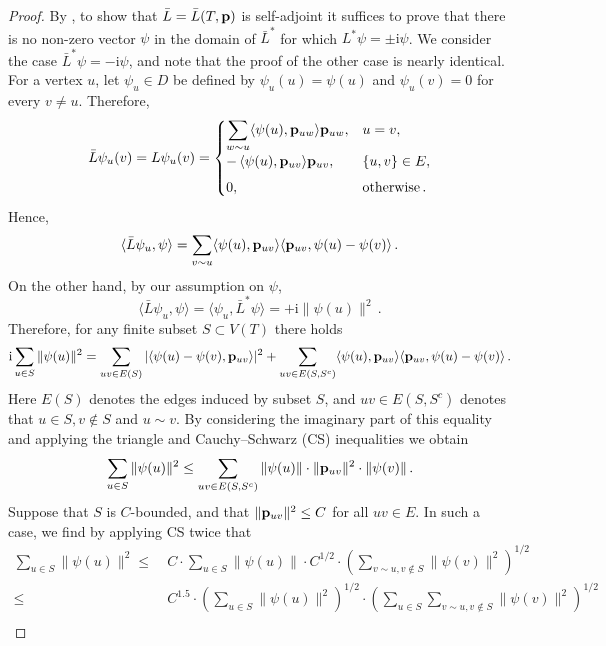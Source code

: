 \documentclass[reqno,english]{amsart}
\numberwithin{equation}{section}
\theoremstyle{definition}{
\newtheorem{example}[theorem]{Example}
\newtheorem{definition}[theorem]{Definition}
\newtheorem*{definition*}{Definition}
\newtheorem{problem}[theorem]{Problem}
\newtheorem{question}[theorem]{Question}
}
\newcommand{\ii}{\mathrm{i}}
\newcommand{\p}{{\bf p}}
\begin{document}
\begin{proof}
    By \cite[Theorem VIII.3]{ReedSimonI}, to show that $\bar L=\bar L(T,\p)$ is self-adjoint it suffices to prove that there is no non-zero vector $\psi$ in the domain of $\bar L^*$ for which $L^*\psi=\pm \ii\psi$. We consider the case $\bar L^*\psi=-\ii\psi$, and note that the proof of the other case is nearly identical. For a vertex $u$, let $\psi_u\in D$ be defined by $\psi_u(u)=\psi(u)$ and $\psi_u(v)=0$ for every $v\ne u$. Therefore,
    \[
        \bar L\psi_u(v) = L\psi_u(v) =
        \begin{cases}
        \displaystyle \sum_{w\sim u} \langle \psi(u),\p_{uw}\rangle\p_{uw}, & u=v,\\[1ex]
        \displaystyle -\,\langle \psi(u),\p_{uv}\rangle\p_{uv}, & \{u,v\}\in E,\\[1ex]
        0, & \text{otherwise}\,.
        \end{cases}
    \]
    Hence,
    \[
        \langle \bar L\psi_u,\psi\rangle =\sum_{v\sim u}\langle\psi(u),\p_{uv}\rangle\langle\p_{uv},\psi(u)-\psi(v)\rangle\,. 
    \]
    On the other hand, by our assumption on $\psi$,
    \[
        \langle \bar L\psi_u,\psi\rangle = \langle \psi_u,\bar L^*\psi \rangle = +\ii\|\psi(u)\|^2\,.
    \]    
    Therefore, for any finite subset $S\subset V(T)$ there holds
    \[
        \ii\sum_{u\in S}\|\psi(u)\|^2 =
        \sum_{uv\in E(S)}|\langle\psi(u)-\psi(v),\p_{uv}\rangle|^2
        +\sum_{uv\in E(S,S^c)}\langle\psi(u),\p_{uv}\rangle\langle\p_{uv},\psi(u)-\psi(v)\rangle\,. 
        \]
        Here $E(S)$ denotes the edges induced by subset $S$, and $uv\in E(S,S^c)$ denotes that $u\in S,v\notin S$ and $u\sim v$. By considering the imaginary part of this equality and applying the triangle and Cauchy--Schwarz (CS) inequalities we obtain 
        \begin{equation}\label{eq:sa_norm}
        \sum_{u\in S}\|\psi(u)\|^2 \leq
        \sum_{uv\in E(S,S^c)} \|\psi(u)\|\cdot \|\p_{uv}\|^2\cdot \|\psi(v)\|\,.
        \end{equation}
        Suppose that $S$ is $C$-bounded, and that $\|\p_{uv}\|^2\le C$ for all $uv\in E$. In such a case, we find by applying CS twice that
        \begin{align*}
            \sum_{u\in S}\|\psi(u)\|^2 
            \leq ~&C\cdot \sum_{u\in S} \|\psi(u)\|\cdot C^{1/2}\cdot\left(\sum_{v\sim u,v\notin S}\|\psi(v)\|^2\right)^{1/2}\\
            \leq~
            &C^{1.5}\cdot \left(\sum_{u\in S} \|\psi(u)\|^2\right)^{1/2}\cdot\left(\sum_{u\in S}\sum_{v\sim u,v\notin S}\|\psi(v)\|^2\right)^{1/2} \\

\end{align*}
\end{proof}
\end{document}
